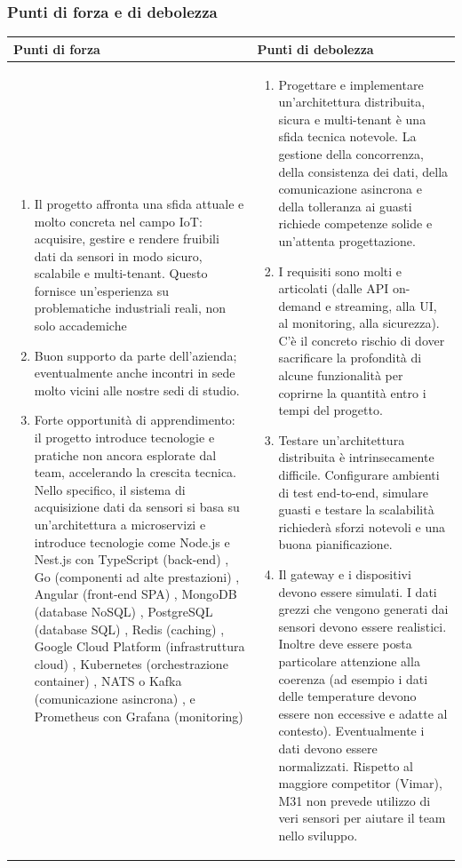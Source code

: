 \documentclass[a4paper,11pt]{article}
\begin{document}
\subsubsection{Punti di forza e di debolezza}
{\footnotesize
\begin{tabularx}{\textwidth}{|X|X|}
\hline
\rowcolor{lightgray!40} %
\textbf{Punti di forza} & \textbf{Punti di debolezza} \\
\hline
\begin{enumerate}
\item Il progetto affronta una sfida attuale e molto concreta nel campo IoT: acquisire, gestire e rendere fruibili dati da sensori in modo sicuro, scalabile e multi-tenant. Questo fornisce un'esperienza su problematiche industriali reali, non solo accademiche
\item Buon supporto da parte dell'azienda; eventualmente anche incontri in sede molto vicini alle nostre sedi di studio.
\item Forte opportunità di apprendimento: il progetto introduce tecnologie e pratiche non ancora esplorate dal team, accelerando la crescita tecnica. Nello specifico, il sistema di acquisizione dati da sensori si basa su un'architettura a microservizi e introduce tecnologie come Node.js e Nest.js con TypeScript (back-end) , Go (componenti ad alte prestazioni) , Angular (front-end SPA) , MongoDB (database NoSQL) , PostgreSQL (database SQL) , Redis (caching) , Google Cloud Platform (infrastruttura cloud) , Kubernetes (orchestrazione container) , NATS o Kafka (comunicazione asincrona) , e Prometheus con Grafana (monitoring)
\end{enumerate}
 & \begin{enumerate}
\item Progettare e implementare un'architettura distribuita, sicura e multi-tenant è una sfida tecnica notevole. La gestione della concorrenza, della consistenza dei dati, della comunicazione asincrona e della tolleranza ai guasti richiede competenze solide e un'attenta progettazione.
\item 	I requisiti sono molti e articolati (dalle API on-demand e streaming, alla UI, al monitoring, alla sicurezza). C'è il concreto rischio di dover sacrificare la profondità di alcune funzionalità per coprirne la quantità entro i tempi del progetto.
\item Testare un'architettura distribuita è intrinsecamente difficile. Configurare ambienti di test end-to-end, simulare guasti e testare la scalabilità richiederà sforzi notevoli e una buona pianificazione.
\item Il gateway e i dispositivi devono essere simulati. I dati grezzi che vengono generati dai sensori devono essere realistici. Inoltre deve essere posta particolare attenzione alla coerenza (ad esempio i dati delle temperature devono essere non eccessive e adatte al contesto). Eventualmente i dati devono essere normalizzati. Rispetto al maggiore competitor (Vimar), M31 non prevede utilizzo di veri sensori per aiutare il team nello sviluppo.
\end{enumerate} \\
\hline
\end{tabularx}
}
\end{document}
